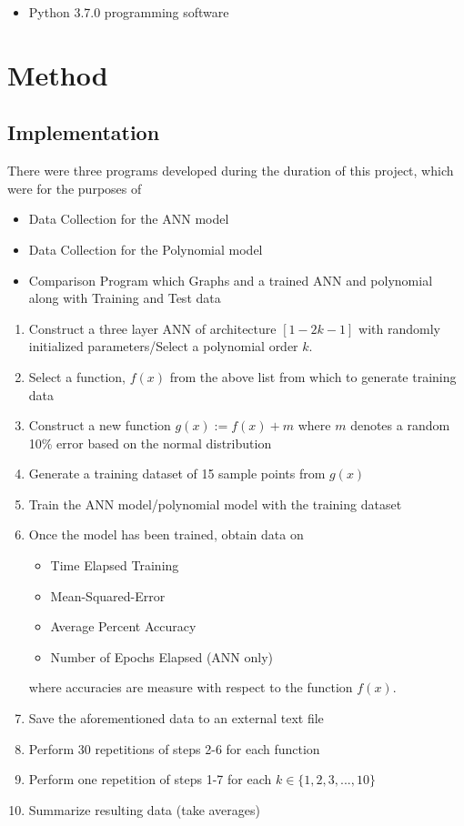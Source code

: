 \documentclass{article}
\begin{document}
    \begin{itemize}
        \item Python 3.7.0 programming software
    \end{itemize}

    \section{Method}

    \subsection{Implementation}
    There were three programs developed during the duration of this project, which were for the purposes of 
    \begin{itemize}
        \item Data Collection for the ANN model
        \item Data Collection for the Polynomial model
        \item Comparison Program which Graphs and a trained ANN and polynomial along with Training and Test data
    \end{itemize}

    \begin{enumerate}
        \item Construct a three layer ANN of architecture $[1-2k-1]$ with randomly initialized parameters/Select a polynomial order $k$.
        \item Select a function, $f(x)$ from the above list from which to generate training data
        \item Construct a new function $g(x) := f(x) + m$ where $m$ denotes a random 10\% error based on the normal distribution
        \item Generate a training dataset of 15 sample points from $g(x)$
        \item Train the ANN model/polynomial model with the training dataset
        \item Once the model has been trained, obtain data on 
        \begin{itemize}
            \item Time Elapsed Training
            \item Mean-Squared-Error
            \item Average Percent Accuracy
            \item Number of Epochs Elapsed (ANN only)
        \end{itemize}
        where accuracies are measure with respect to the function $f(x)$.
        \item Save the aforementioned data to an external text file
        \item Perform 30 repetitions of steps 2-6 for each function
        \item Perform one repetition of steps 1-7 for each $k \in \{1, 2, 3, ..., 10\}$
        \item Summarize resulting data (take averages)
    \end{enumerate}
\end{document}
